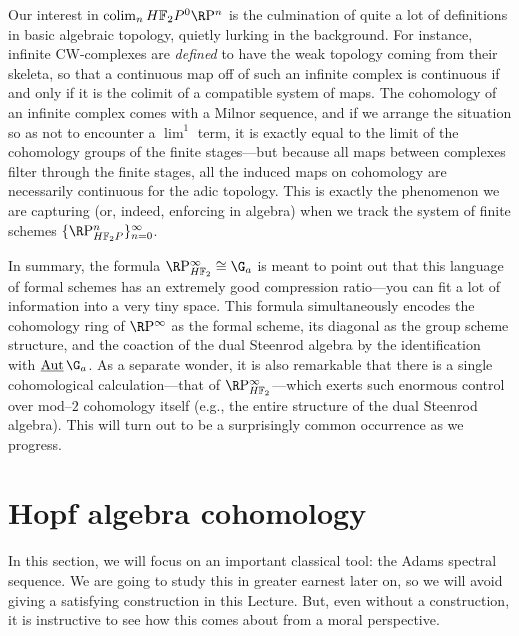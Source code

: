 \begin{remark}
Our interest in $\colim_n \HFtwo P^0 \RP^n$ is the culmination of quite a lot of definitions in basic algebraic topology, quietly lurking in the background.  For instance, infinite CW-complexes are \emph{defined} to have the weak topology coming from their skeleta, so that a continuous map off of such an infinite complex is continuous if and only if it is the colimit of a compatible system of maps.  The cohomology of an infinite complex comes with a Milnor sequence, and if we arrange the situation so as not to encounter a $\lim^1$ term, it is exactly equal to the limit of the cohomology groups of the finite stages---but because all maps between complexes filter through the finite stages, all the induced maps on cohomology are necessarily continuous for the adic topology.  This is exactly the phenomenon we are capturing (or, indeed, enforcing in algebra) when we track the system of finite schemes $\{\RP^n_{\HFtwo P}\}_{n=0}^\infty$.
\end{remark}

In summary, the formula $\RP^\infty_{\HFtwo} \cong \G_a$ is meant to point out that this language of formal schemes has an extremely good compression ratio---you can fit a lot of information into a very tiny space.  This formula simultaneously encodes the cohomology ring of $\RP^\infty$ as the formal scheme, its diagonal as the group scheme structure, and the coaction of the dual Steenrod algebra by the identification with $\InternalAut{\G_a}$.  As a separate wonder, it is also remarkable that there is a single cohomological calculation---that of $\RP^\infty_{\HFtwo}$---which exerts such enormous control over mod--$2$ cohomology itself (e.g., the entire structure of the dual Steenrod algebra).  This will turn out to be a surprisingly common occurrence as we progress.








\section{Hopf algebra cohomology}\label{HopfAlgebraLecture}

In this section, we will focus on an important classical tool: the Adams spectral sequence.  We are going to study this in greater earnest later on, so we will avoid giving a satisfying construction in this Lecture.  But, even without a construction, it is instructive to see how this comes about from a moral perspective.  

